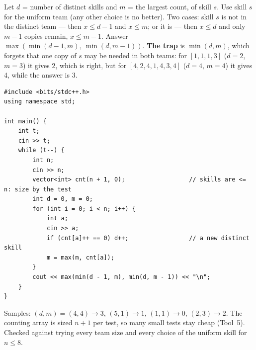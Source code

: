 \begin{solutionbox}
Let $d$ = number of distinct skills and $m$ = the largest count, of skill $s$. Use skill $s$ for the uniform team (any other choice is no better). Two cases: skill $s$ is not in the distinct team --- then $x \le d - 1$ and $x \le m$; or it is --- then $x \le d$ and only $m - 1$ copies remain, $x \le m - 1$. Answer $\max(\min(d-1, m),\ \min(d, m-1))$. \textbf{The trap} is $\min(d, m)$, which forgets that one copy of $s$ may be needed in both teams: for $[1,1,1,3]$ ($d = 2$, $m = 3$) it gives 2, which is right, but for $[4,2,4,1,4,3,4]$ ($d = 4$, $m = 4$) it gives 4, while the answer is 3.
\begin{lstlisting}[style=cpp]
#include <bits/stdc++.h>
using namespace std;

int main() {
    int t;
    cin >> t;
    while (t--) {
        int n;
        cin >> n;
        vector<int> cnt(n + 1, 0);                  // skills are <= n: size by the test
        int d = 0, m = 0;
        for (int i = 0; i < n; i++) {
            int a;
            cin >> a;
            if (cnt[a]++ == 0) d++;                 // a new distinct skill
            m = max(m, cnt[a]);
        }
        cout << max(min(d - 1, m), min(d, m - 1)) << "\n";
    }
}
\end{lstlisting}
Samples: $(d, m) = (4,4) \to 3$, $(5,1) \to 1$, $(1,1) \to 0$, $(2,3) \to 2$. The counting array is sized $n + 1$ per test, so many small tests stay cheap (Tool~5). Checked against trying every team size and every choice of the uniform skill for $n \le 8$.
\end{solutionbox}
